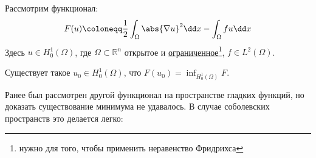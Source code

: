 
Рассмотрим функционал:
\begin{equation}
  F(u) \coloneqq \frac{1}{2} \int_\Omega \abs{\nabla u}^2 \dd x - \int_\Omega fu \dd x
\end{equation}
Здесь $u \in H_0^1(\Omega)$, где $\Omega \subset \mathbb{R}^n$ открытое и \underline{ограниченное}\footnote{нужно для того, чтобы применить неравенство Фридрихса}, $f \in L^2(\Omega)$.

\begin{thm}
  Существует такое $u_0 \in H_0^1(\Omega)$, что $F(u_0) = \inf_{H_0^1(\Omega)} F$.
\end{thm}

Ранее был рассмотрен другой функционал на пространстве гладких функций, но доказать существование минимума не удавалось. В случае соболевских пространств это делается легко:

